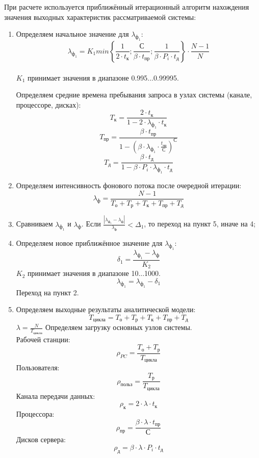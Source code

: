 При расчете используется приближённый итерационный алгоритм нахождения значения выходных характеристик рассматриваемой системы:
\begin{enumerate}

\item Определяем начальное значение для $\lambda_{\text{ф}_1}$: \\
 $$\lambda_{\text{ф}_1} = K_1min\left\{\frac{1}{2\cdot t_{\text{к}}};\frac{\text{С}}{\beta\cdot t_{\text{пр}}};\frac{1}{\beta\cdot P_i\cdot t_{\text{д}}}\right\}\cdot\frac{N - 1}{N}$$ \\
 $K_1$ принимает значения в диапазоне 0.995...0.99995.\par
 Определяем средние времена пребывания запроса в узлах системы (канале, процессоре, дисках): \\
 $$T_{\text{к}} = \frac{2\cdot t_{\text{к}}}{1 - 2\cdot\lambda_{\text{ф}_1}\cdot t_{\text{к}}}$$
 $$T_{\text{пр}} = \frac{\beta\cdot t_{\text{пр}}}{1 - (\beta\cdot\lambda_{\text{ф}_1}\cdot\frac{t_{\text{пр}}}{\text{С}})^{\text{С}}}$$
 $$T_{\text{д}} = \frac{\beta\cdot t_{\text{д}}}{1 - \beta\cdot P_i\cdot\lambda_{\text{ф}_1}\cdot t_{\text{д}}}$$
 
\item Определяем интенсивность фонового потока после очередной итерации:
 $$\lambda_{\text{ф}} = \frac{N - 1}{T_{\text{о}} + T_{\text{р}} + T_{\text{к}} + T_{\text{пр}} + T_{\text{д}}}$$
 
\item Сравниваем $\lambda_{\text{ф}_1}$ и $\lambda_{\text{ф}}$. Если $\frac{|\lambda_{\text{ф}_1} - \lambda_{\text{ф}}|}{\lambda_{\text{ф}}} < \Delta_1$, то переход на пункт 5, иначе на 4;

\item Определяем новое приближённое значение для $\lambda_{\text{ф}_1}$:
 $$\delta_1 = \frac{\lambda_{\text{ф}_1} - \lambda_{\text{ф}}}{K_2}$$
 $K_2$ принимает значения в диапазоне 10...1000.
 $$\lambda_{\text{ф}_1} = \lambda_{\text{ф}_1} - \delta_1$$
 Переход на пункт 2.
 
\item Определяем выходные результаты аналитической модели: \\
 $$T_{\text{цикла}} = T_{\text{о}} + T_{\text{р}} + T_{\text{к}} + T_{\text{пр}} + T_{\text{д}}$$
 $\lambda = \frac{N}{T_{\text{цикла}}}$
 Определяем загрузку основных узлов системы.\\ 
 Рабочей станции: $$\rho_{PC} = \frac{T_{\text{о}} + T_{\text{р}}}{T_{\text{цикла}}}$$
 Пользователя: $$\rho_{\text{польз}} = \frac{T_{\text{р}}}{T_{\text{цикла}}}$$
 Канала передачи данных: $$\rho_{\text{к}} = 2\cdot\lambda\cdot t_{\text{к}}$$
 Процессора: $$\rho_{\text{пр}} = \frac{\beta\cdot\lambda\cdot t_{\text{пр}}}{\text{С}}$$
 Дисков сервера: $$\rho_{\text{д}} = \beta\cdot\lambda\cdot P_i\cdot t_{\text{д}}$$

\end{enumerate}

